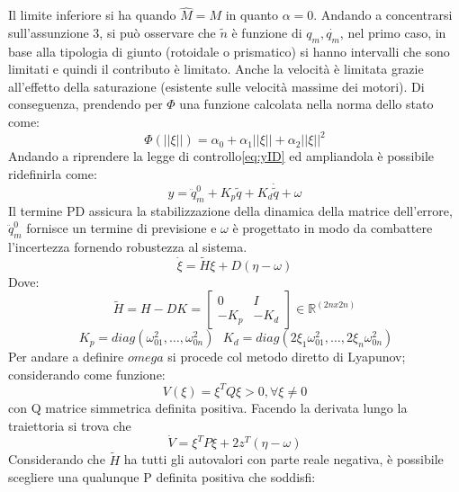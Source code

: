 Il limite inferiore si ha quando $\hat{M} = M$ in quanto $\alpha = 0$. Andando a concentrarsi sull'assunzione 3, si può osservare che $\tilde{n}$ è funzione di $q_m,\dot{q_m}$, nel primo caso, in base alla tipologia di giunto (rotoidale o prismatico) si hanno intervalli che sono limitati e quindi il contributo è limitato. Anche la velocità è limitata grazie all'effetto della saturazione (esistente sulle velocità massime dei motori). Di conseguenza, prendendo per $\Phi$ una funzione calcolata nella norma dello stato come:
\begin{equation}
\Phi(||\xi||) = \alpha_0 + \alpha_1 ||\xi|| + \alpha_2 ||\xi||^2
\end{equation}
Andando a riprendere la legge di controllo\ref{eq:yID} ed ampliandola è possibile ridefinirla come: 
\begin{equation}
y = \ddot{q}^0_m + K_p\tilde{q} + K_d\dot{\tilde{q}} + \omega
\label{eq:yRob}
\end{equation}
Il termine PD assicura la stabilizzazione della dinamica della matrice dell'errore, $\ddot{q}^0_m$ fornisce un termine di previsione e $\omega$ è progettato in modo da combattere l'incertezza fornendo robustezza al sistema.
\begin{equation}
\dot{\xi} = \tilde{H}\xi + D(\eta-\omega)
\end{equation}
Dove:
\begin{equation*}
\tilde{H} = H-DK = \begin{bmatrix}
0 & I \\ -K_p & -K_d
\end{bmatrix} \in 
\mathbb{R}^{(2nx2n)}
\end{equation*}
\begin{equation*}
 \ K_p = diag(\omega^2_{01}, \dots, \omega^2_{0n})  \ \ \  K_d = diag(2 \xi_1 \omega^2_{01}, \dots ,2 \xi_n \omega^2_{0n}) 
\end{equation*}
Per andare a definire $omega$ si procede col metodo diretto di Lyapunov; considerando come funzione:
\begin{equation}
V(\xi) = \xi^TQ\xi >0 , \forall \xi \neq 0
\end{equation}
con Q matrice simmetrica definita positiva. Facendo la derivata lungo la traiettoria si trova che
\begin{equation}
\dot{V} = \xi^T P\xi + 2z^T(\eta-\omega)
\label{eq:LyapDerivRob}
\end{equation}
Considerando che $\tilde{H}$ ha tutti gli autovalori con parte reale negativa, è possibile scegliere una qualunque P definita positiva che soddisfi:
